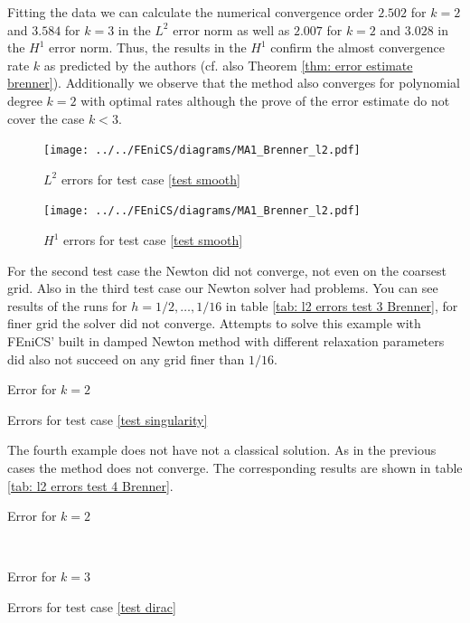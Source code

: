 Fitting the data we can calculate the numerical convergence order $2.502$ for $k=2$ and $3.584$ for $k=3$ in the $L^2$ error norm as well as $2.007$ for $k=2$ and $3.028$ in the $H^1$ error norm. Thus, the results in the $H^1$ confirm the almost convergence rate $k$ as predicted by the authors (cf. also Theorem \ref{thm: error estimate brenner}).
Additionally we observe that the method also converges for polynomial degree $k=2$ with optimal rates although the prove of the error estimate do not cover the case $k<3$.

\begin{figure}[H]
\centering
	\texttt{[image: ../../FEniCS/diagrams/MA1\_Brenner\_l2.pdf]}
	\caption{$L^2$ errors for test case \ref{test smooth}}
	\label{fig: Brenner test1}
\end{figure}
\begin{figure}[H]
	\centering
	\texttt{[image: ../../FEniCS/diagrams/MA1\_Brenner\_l2.pdf]}
	\caption{$H^1$ errors for test case \ref{test smooth}}
	\label{fig: Brenner test1 h1}
\end{figure}

For the second test case the Newton did not converge, not even on the coarsest grid. Also in the third test case our Newton solver had problems. You can see results of the runs for $h=1/2, \dots, 1/16$ in table \ref{tab: l2 errors test 3 Brenner}, for finer grid the solver did not converge. Attempts to solve this example with FEniCS' built in damped Newton method with different relaxation parameters did also not succeed on any grid finer than $1/16$.
\begin{table}[h]
		\centering
		\pgfplotstabletypeset[columns={iterations, l2error, h1error,N},
				    every row 0 column 0/.style={set content=init},
		]\MAThreeBrennerTwo
    	\caption{Error for $k=2$}
	\caption{Errors for test case \ref{test singularity}}
	\label{tab: l2 errors test 3 Brenner}
\end{table}

The fourth example does not have not a classical solution. As in the previous cases the method does not converge. The corresponding results are shown in table \ref{tab: l2 errors test 4 Brenner}.

\begin{table}[H]
	\begin{subtable}[b]{0.45\textwidth}
		\centering
		\pgfplotstabletypeset[columns={iterations, l2error, h1error,N},
				    every row 0 column 0/.style={set content=init},
				    columns/l2error/.style={ /pgf/number format/sci precision=6}     %
		]\MAFourBrennerTwo
    	\caption{Error for $k=2$}
   \end{subtable}
   ~
	\begin{subtable}[b]{0.45\textwidth}
		\centering
		\pgfplotstabletypeset[columns={iterations, l2error, h1error,N},
				    every row 0 column 0/.style={set content=init},
				    columns/l2error/.style={ /pgf/number format/sci precision=6}     %
		]\MAFourBrennerThree
 	\caption{Error for $k=3$}
	\end{subtable}
	\caption{Errors for test case \ref{test dirac}}
	\label{tab: l2 errors test 4 Brenner}
\end{table}

